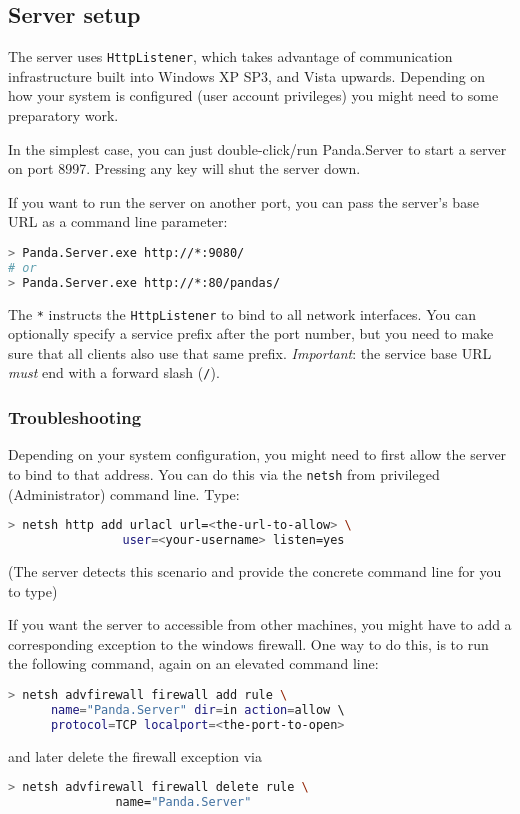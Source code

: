 \documentclass[a4paper,12pt]{article}
\begin{document}
\subsection{Server setup}
The server uses \lstinline!HttpListener!, which takes advantage of communication infrastructure built into Windows XP SP3, and Vista upwards. 
Depending on how your system is configured (user account privileges) you might need to some preparatory work.

In the simplest case, you can just double-click/run Panda.Server to start a server on port 8997. 
Pressing any key will shut the server down.

If you want to run the server on another port, you can pass the server's base URL as a command line parameter:

\begin{lstlisting}[language=bash]
> Panda.Server.exe http://*:9080/
# or
> Panda.Server.exe http://*:80/pandas/
\end{lstlisting}

The \lstinline!*! instructs the \lstinline!HttpListener! to bind to all network interfaces. 
You can optionally specify a service prefix after the port number, but you need to make sure that all clients also use that same prefix.
\emph{Important}: the service base URL \emph{must} end with a forward slash (\lstinline!/!).

\subsubsection{Troubleshooting}
Depending on your system configuration, you might need to first allow the server to bind to that address.
You can do this via the \lstinline[language=bash]!netsh! from privileged (Administrator) command line.
Type:
\begin{lstlisting}[language=bash]
> netsh http add urlacl url=<the-url-to-allow> \ 
                user=<your-username> listen=yes
\end{lstlisting}
(The server detects this scenario and provide the concrete command line for you to type)

If you want the server to accessible from other machines, you might have to add a corresponding exception to the windows firewall.
One way to do this, is to run the following command, again on an elevated command line:
\begin{lstlisting}[language=bash]
> netsh advfirewall firewall add rule \ 
      name="Panda.Server" dir=in action=allow \ 
      protocol=TCP localport=<the-port-to-open>
\end{lstlisting}
and later delete the firewall exception via
\begin{lstlisting}[language=bash]
> netsh advfirewall firewall delete rule \
               name="Panda.Server"
\end{lstlisting}
\end{document}
